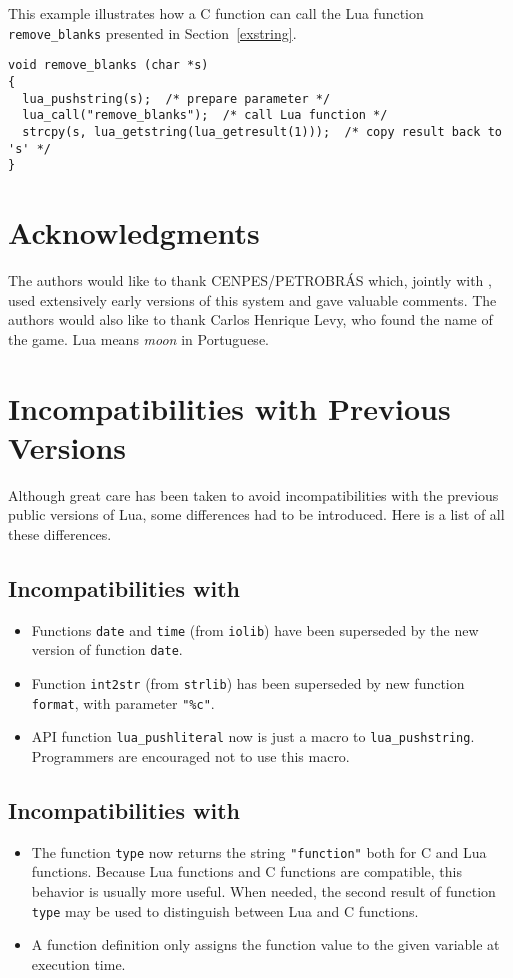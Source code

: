 This example illustrates how a C function can call the Lua function
\verb'remove_blanks' presented in Section~\ref{exstring}.
\begin{verbatim}
void remove_blanks (char *s)
{
  lua_pushstring(s);  /* prepare parameter */
  lua_call("remove_blanks");  /* call Lua function */
  strcpy(s, lua_getstring(lua_getresult(1)));  /* copy result back to 's' */
}
\end{verbatim}


\section*{Acknowledgments}

The authors would like to thank CENPES/PETROBR\'AS which,
jointly with \tecgraf, used extensively early versions of
this system and gave valuable comments.
The authors would also like to thank Carlos Henrique Levy,
who found the name of the game.
Lua means {\em moon} in Portuguese.



\appendix

\section{Incompatibilities with Previous Versions}

Although great care has been taken to avoid incompatibilities with
the previous public versions of Lua,
some differences had to be introduced.
Here is a list of all these differences.

\subsection*{Incompatibilities with }
\begin{itemize}
\item
Functions \verb'date' and \verb'time' (from \verb'iolib')
have been superseded by the new version of function \verb'date'.
\item
Function \verb'int2str' (from \verb'strlib') has been superseded by new
function \verb'format', with parameter \verb'"%c"'.
\item
API function \verb'lua_pushliteral' now is just a macro to
\verb'lua_pushstring'.
Programmers are encouraged not to use this macro.
\end{itemize}

\subsection*{Incompatibilities with }
\begin{itemize}
\item
The function \verb'type' now returns the string \verb'"function"'
both for C and Lua functions.
Because Lua functions and C functions are compatible,
this behavior is usually more useful.
When needed, the second result of function {\tt type} may be used
to distinguish between Lua and C functions.
\item
A function definition only assigns the function value to the
given variable at execution time.
\end{itemize}

